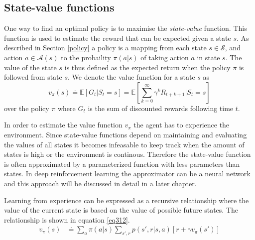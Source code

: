 \documentclass[11pt]{article}
\begin{document}
\maketitle

\subsection{State-value functions}

One way to find an optimal policy is to maximise the \textit{state-value} function.
This function is used to estimate the reward that can be expected given a state $s$.
As described in Section \ref{policy} a policy is a mapping from each state $s \in \mathcal{S}$, and
action $a \in \mathcal{A}(s)$ to the probaility $\pi(a|s)$ of taking action $a$ in state $s$.
The value of the state $s$ is thus defined as the expected return when the policy
$\pi$ is followed from state $s$.
We denote the value function for a state $s$ as
\begin{equation}\label{eqstatevalue}
    v_\pi(s) \doteq \mathds{E}[G_t | S_t = s] =
    \mathds{E}
    \left [
        \sum\limits_{k=0}^\infty \gamma^k R_{t + k + 1} | S_t = s
    \right ]
\end{equation}
over the policy $\pi$ where $G_t$ is the sum of discounted rewards following time $t$.

In order to estimate the value function $v_\pi$ the agent has to experience
the environment.
Since state-value functions depend on maintaining and evaluating the values of all states
it becomes infeasable to keep track when the amount of states is high or the
environment is continous.
Therefore the state-value function is often approximated by a parameterized function
with less parameters than states\cite{RLbook}.
In deep reinforcement learning the approximator can be a neural network
and this approach will be discussed in detail in a later chapter.

Learning from experience can be expressed as a recursive relationship where the
value of the current state is based on the value of possible future states.
The relationship is shown in equation \ref{eq312}.
\begin{equation}\label{eq312}
    \begin{split}
        v_\pi(s) & \doteq \sum\limits_a \pi(a|s) \sum\limits_{s',r}p(s',r|s, a)\left [r + \gamma v_\pi(s') \right ]
    \end{split}
\end{equation}
 
\end{document}
